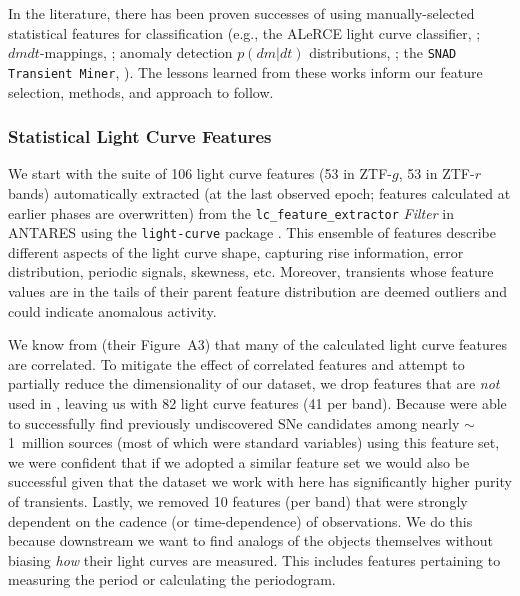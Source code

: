 \documentclass[twocolumn]{aastex63}
\begin{document}
In the literature, there has been proven successes of using manually-selected statistical features for classification (e.g., the ALeRCE light curve classifier, \citealt{SanchezSaez2021}; $dmdt$-mappings, \citealt{Mahabal2017}; anomaly detection $p(dm|dt)$ distributions, \citealt{Soraisam2020}; the \texttt{SNAD Transient Miner}, \citealt{Aleo2022}). The lessons learned from these works inform our feature selection, methods, and approach to follow.  \par


\subsubsection{Statistical Light Curve Features} \label{subsubsec:lc_features}

We start with the suite of 106 light curve features (53 in ZTF-$g$, 53 in ZTF-$r$ bands) automatically extracted (at the last observed epoch; features calculated at earlier phases are overwritten) from the \texttt{lc\_feature\_extractor} \emph{Filter} in ANTARES using the \texttt{light-curve} package \citep{Malanchev-LC}. This ensemble of features describe different aspects of the light curve shape, capturing rise information, error distribution, periodic signals, skewness, etc. Moreover, transients whose feature values are in the tails of their parent feature distribution are deemed outliers and could indicate anomalous activity. 

We know from \cite{Malanchev2021} (their Figure~A3) that many of the calculated light curve features are correlated. To mitigate the effect of correlated features and attempt to partially reduce the dimensionality of our dataset, we drop features that are \emph{not} used in \cite{Aleo2022}, leaving us with 82 light curve features (41 per band). Because \cite{Aleo2022} were able to successfully find previously undiscovered SNe candidates among nearly $\sim$1~million sources (most of which were standard variables) using this feature set, we were confident that if we adopted a similar feature set we would also be successful given that the dataset we work with here has significantly higher purity of transients. %
Lastly, we removed 10 features (per band) that were strongly dependent on the cadence (or time-dependence) of observations. We do this because downstream we want to find analogs of the objects themselves without biasing \emph{how} their light curves are measured. This includes features pertaining to measuring the period or calculating the periodogram.  \par
\end{document}
